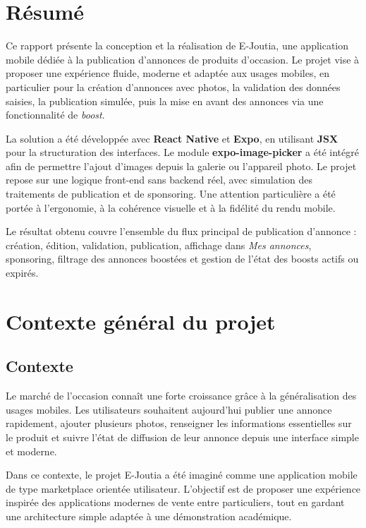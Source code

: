 \documentclass[12pt,a4paper]{report}
\newcommand{\projectname}{E-Joutia}
\begin{document}
\tableofcontents
\listoffigures
\clearpage

\chapter*{Résumé}
Ce rapport présente la conception et la réalisation de \projectname{}, une application mobile dédiée à la publication d'annonces de produits d'occasion. Le projet vise à proposer une expérience fluide, moderne et adaptée aux usages mobiles, en particulier pour la création d'annonces avec photos, la validation des données saisies, la publication simulée, puis la mise en avant des annonces via une fonctionnalité de \textit{boost}.

La solution a été développée avec \textbf{React Native} et \textbf{Expo}, en utilisant \textbf{JSX} pour la structuration des interfaces. Le module \textbf{expo-image-picker} a été intégré afin de permettre l'ajout d'images depuis la galerie ou l'appareil photo. Le projet repose sur une logique front-end sans backend réel, avec simulation des traitements de publication et de sponsoring. Une attention particulière a été portée à l'ergonomie, à la cohérence visuelle et à la fidélité du rendu mobile.

Le résultat obtenu couvre l'ensemble du flux principal de publication d'annonce : création, édition, validation, publication, affichage dans \textit{Mes annonces}, sponsoring, filtrage des annonces boostées et gestion de l'état des boosts actifs ou expirés.


\chapter{Contexte général du projet}
\section{Contexte}
Le marché de l'occasion connaît une forte croissance grâce à la généralisation des usages mobiles. Les utilisateurs souhaitent aujourd'hui publier une annonce rapidement, ajouter plusieurs photos, renseigner les informations essentielles sur le produit et suivre l'état de diffusion de leur annonce depuis une interface simple et moderne.

Dans ce contexte, le projet \projectname{} a été imaginé comme une application mobile de type marketplace orientée utilisateur. L'objectif est de proposer une expérience inspirée des applications modernes de vente entre particuliers, tout en gardant une architecture simple adaptée à une démonstration académique.
\end{document}
